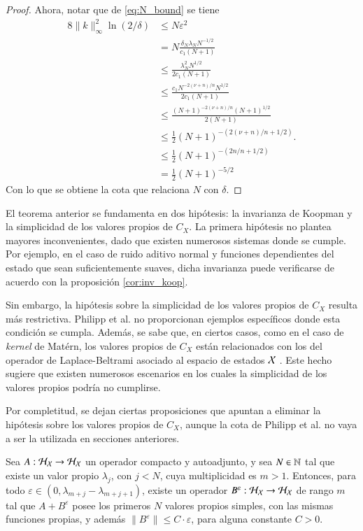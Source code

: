 \begin{proof}
    Ahora, notar que de \ref{eq:N_bound} se tiene
    \begingroup
    \allowdisplaybreaks
    \begin{align*}
        8\|k\|^2_\infty \ln(2/\delta) & \leq N \varepsilon^2 \\
        & = N \frac{\delta_N \lambda_N N^{-1/2}}{c_1 (N+1)} \\
        & \leq \frac{\lambda_N^2 N^{1/2}}{2c_1 (N+1)} \\
        & \leq \frac{c_1 N^{-2(\nu+n)/n} N^{1/2}}{2c_1 (N+1)} \\
        & \leq \frac{ (N+1)^{-2(\nu+n)/n} (N+1)^{1/2}}{2 (N+1)} \\
        & \leq \frac{1}{2} (N+1)^{-(2(\nu+n)/n + 1/2)}. \\
        & \leq \frac{1}{2} (N+1)^{-(2n/n + 1/2)} \\
        & = \frac{1}{2} (N+1)^{-5/2}
    \end{align*}
    \endgroup
    Con lo que se obtiene la cota que relaciona $N$ con $\delta$.
\end{proof}

El teorema anterior se fundamenta en dos hipótesis: la invarianza de Koopman y la simplicidad de los valores propios de \( C_X \). La primera hipótesis no plantea mayores inconvenientes, dado que existen numerosos sistemas donde se cumple. Por ejemplo, en el caso de ruido aditivo normal y funciones dependientes del estado que sean suficientemente suaves, dicha invarianza puede verificarse de acuerdo con la proposición \ref{cor:inv_koop}.

Sin embargo, la hipótesis sobre la simplicidad de los valores propios de \( C_X \) resulta más restrictiva. Philipp et al. no proporcionan ejemplos específicos donde esta condición se cumpla. Además, se sabe que, en ciertos casos, como en el caso de \textit{kernel} de Matérn, los valores propios de \( C_X \) están relacionados con los del operador de Laplace-Beltrami asociado al espacio de estados \( \mathcal{X} \) \cite{Whittle1963StochasticDimensions, Borovitskiy2020MaternManifolds}. Este hecho sugiere que existen numerosos escenarios en los cuales la simplicidad de los valores propios podría no cumplirse.

Por completitud, se dejan ciertas proposiciones que apuntan a eliminar la hipótesis sobre los valores propios de $C_X$, aunque la cota de Philipp et al. no vaya a ser la utilizada en secciones anteriores.

\begin{prop}
    Sea $A: \mathcal{H}_{\mathcal{X}} \to \mathcal{H}_{\mathcal{X}}$ un operador compacto y autoadjunto, y sea $N \in \mathbb{N}$ tal que existe un valor propio $\lambda_j$, con $j < N$, cuya multiplicidad es $m > 1$. Entonces, para todo $\varepsilon \in (0, \lambda_{m+j} - \lambda_{m+j+1})$, existe un operador $B^\varepsilon: \mathcal{H}_{\mathcal{X}} \to \mathcal{H}_{\mathcal{X}}$ de rango $m$ tal que $A + B^\varepsilon$ posee los primeros $N$ valores propios simples, con las mismas funciones propias, y además $\| B^\varepsilon \| \leq C \cdot \varepsilon$, para alguna constante $C > 0$.
    \label{prop:val_prop_sim}
\end{prop}

